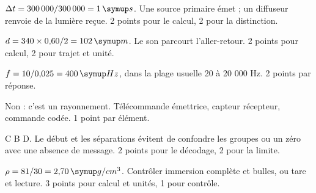 \label{cor-B4}
\par\noindent\begin{minipage}{\linewidth}
$\Delta t=300\,000/300\,000=1\unite s$. Une source primaire émet ; un diffuseur renvoie de la lumière reçue. 2 points pour le calcul, 2 pour la distinction.\par
\end{minipage}\par
\par\noindent\begin{minipage}{\linewidth}
$d=340\times0{,}60/2=102\unite m$. Le son parcourt l’aller-retour. 2 points pour calcul, 2 pour trajet et unité.\par
{}
\end{minipage}\par
\par\noindent\begin{minipage}{\linewidth}
$f=10/0{,}025=400\unite{Hz}$, dans la plage usuelle 20 à 20 000 Hz. 2 points par réponse.\par
{}
\end{minipage}\par
\par\noindent\begin{minipage}{\linewidth}
Non : c’est un rayonnement. Télécommande émettrice, capteur récepteur, commande codée. 1 point par élément.\par
\end{minipage}\par
\par\noindent\begin{minipage}{\linewidth}
C B D. Le début et les séparations évitent de confondre les groupes ou un zéro avec une absence de message. 2 points pour le décodage, 2 pour la limite.\par
\end{minipage}\par
{}
\label{cor-E1}
\par\noindent\begin{minipage}{\linewidth}
$\rho=81/30=2{,}70\unite{g/cm^3}$. Contrôler immersion complète et bulles, ou tare et lecture. 3 points pour calcul et unités, 1 pour contrôle.\par
\end{minipage}\par

